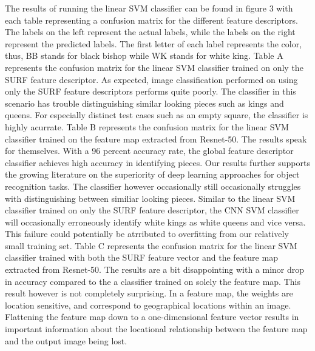 \documentclass{article}
\begin{document}
\hspace{\parindent}The results of running the linear SVM classifier can be found in figure 3 with each table representing a confusion matrix for the different feature descriptors. The labels on the left represent the actual labels, while the labels on the right represent the predicted labels. The first letter of each label represents the color, thus, BB stands for black bishop while WK stands for white king.\newline
\indent Table A represents the confusion matrix for the linear SVM classifier trained on only the SURF feature descriptor. As expected, image classification performed on using only the SURF feature descriptors performs quite poorly. The classifier in this scenario has trouble distinguishing similar looking pieces such as kings and queens. For especially distinct test cases such as an empty square, the classifier is highly acurrate. \newline
\indent Table B represents the confusion matrix for the linear SVM classifier trained on the feature map extracted from Resnet-50. The results speak for themselves. With a 96 percent accuracy rate, the global feature descriptor classifier achieves high accuracy in identifying pieces. Our results further supports the growing literature on the superiority of deep learning approaches for object recognition tasks. The classifier however occasionally still occasionally struggles with distinguishing between similiar looking pieces. Similar to the linear SVM classifier trained on only the SURF feature descriptor, the CNN SVM classifier will occasionally erroneously identify white kings as white queens and vice versa. This failure could potentially be atrributed to overfitting from our relatively small training set.
\newline\indent Table C represents the confusion matrix for the linear SVM classifier trained with both the SURF feature vector and the feature map extracted from Resnet-50. The results are a bit disappointing with a minor drop in accuracy compared to the a classifier trained on solely the feature map. This result however is not completely surprising. In a feature map, the weights are location sensitive, and correspond to geographical locations within an image. Flattening the feature map down to a one-dimensional feature vector results in important information about the locational relationship between the feature map and the output image being lost.
\end{document}
